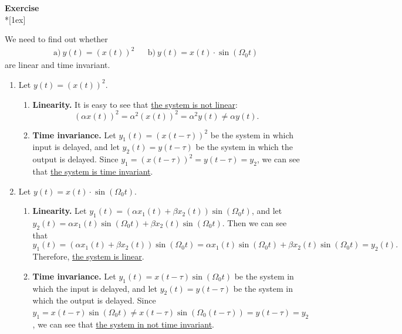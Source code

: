 \documentclass[12pt,a4paper,austrian]{article}
\newcounter{theaufgabe}\setcounter{theaufgabe}{1}
\newenvironment{aufgabe}[1]%
  {\bigskip\par\noindent\begin{nopagebreak}
   \textsf{\textbf{Exercise \arabic{theaufgabe}}}\quad
      \textsf{\textit{#1}}\\*[1ex]%
\stepcounter{theaufgabe}\hspace{2ex}\end{nopagebreak}}
  {\par\pagebreak[2]}
\begin{document}
\pagebreak
\begin{aufgabe}{} %
  We need to find out whether
  \begin{align*}
    &\text{a)} \ y(t) = \left( x(t) \right)^2
    &&\text{b)} \ y(t) = x(t) \cdot \sin{(\Omega_0 t)}
  \end{align*}
  are linear and time invariant.

  \begin{enumerate}
    \item Let $y(t) = \left( x(t) \right)^2$.
    \begin{enumerate}

      \item \textbf{Linearity.} It is easy to see that \underline{the system is not linear}:
      $$
      \left( \alpha x(t) \right)^2
      = \alpha^2 \left( x(t) \right)^2
      = \alpha^2 y(t)
      \neq \alpha y(t).
      $$

      \item \textbf{Time invariance.} Let $y_1(t) = \left( x(t-\tau) \right)^2$ be the system in which input is delayed, and let $y_2(t) = y(t-\tau)$ be the system in which the output is delayed. Since $y_1 = \left( x(t-\tau) \right)^2 = y(t-\tau) = y_2$, we can see that \underline{the system is time invariant}.

    \end{enumerate}

    \item Let $y(t) = x(t) \cdot \sin{(\Omega_0 t)}$.
    \begin{enumerate}

      \item \textbf{Linearity.} Let $y_1(t) = \left(\alpha x_1(t) + \beta x_2(t)\right) \sin{(\Omega_0 t)}$, and let $y_2(t) = \alpha x_1(t) \sin{(\Omega_0 t)} + \beta x_2(t) \sin{(\Omega_0 t)}$. Then we can see that
      $$
      y_1(t) = \left(\alpha x_1(t) + \beta x_2(t)\right) \sin{(\Omega_0 t)} = \alpha x_1(t) \sin{(\Omega_0 t)} + \beta x_2(t) \sin{(\Omega_0 t)} = y_2(t).
      $$
      Therefore, \underline{the system is linear}.

      \item \textbf{Time invariance.} Let $y_1(t) = x(t-\tau) \sin{(\Omega_0 t)}$ be the system in which the input is delayed, and let $y_2(t) = y(t-\tau)$ be the system in which the output is delayed. Since $y_1 = x(t-\tau) \sin{(\Omega_0 t)} \neq x(t-\tau) \sin{(\Omega_0 (t-\tau))} = y(t-\tau) = y_2$, we can see that \underline{the system in not time invariant}.
    \end{enumerate}
  \end{enumerate}

\end{aufgabe}
\end{document}
